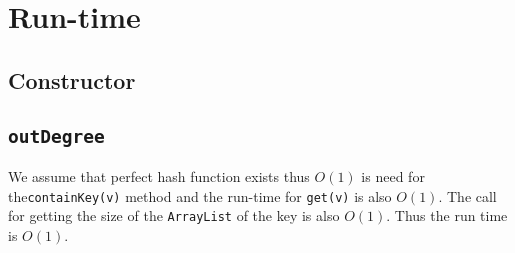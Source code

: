 \documentclass[10pt,letterpaper]{article}
\begin{document}
\section{Run-time}
\subsection{Constructor}
\subsection{\texttt{outDegree}}
We assume that perfect hash function exists thus $O(1)$ is need for the\texttt{containKey(v)} method and the run-time for \texttt{get(v)} is also $O(1)$. The call for getting the size of the \texttt{ArrayList} of the key is also $O(1)$.
Thus the run time is $O(1)$.
\end{document}
